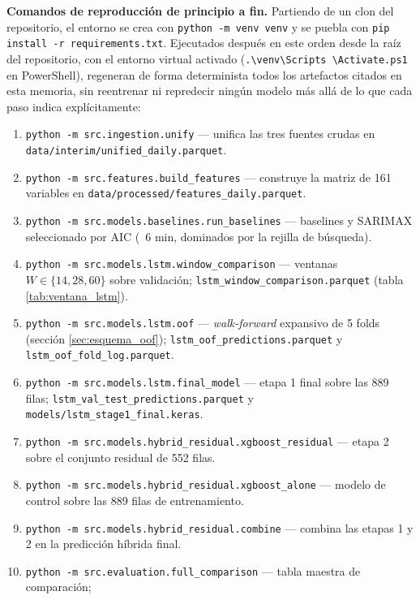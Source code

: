 \begin{sloppypar}
\textbf{Comandos de reproducción de principio a fin.} Partiendo de un clon del
repositorio, el entorno se crea con \texttt{python -m venv venv} y se puebla con
\texttt{pip install -r requirements.txt}. Ejecutados después en este orden desde la raíz
del repositorio, con el entorno virtual activado
(\texttt{.\allowbreak{}\textbackslash{}venv\allowbreak{}\textbackslash{}Scripts%
\allowbreak{}\textbackslash{}Activate.ps1} en PowerShell), regeneran de forma determinista
todos los artefactos citados en esta memoria, sin reentrenar ni repredecir ningún modelo
más allá de lo que cada paso indica explícitamente:

{\small
\begin{enumerate}[nosep]
  \item \texttt{python -m src.ingestion.unify} — unifica las tres fuentes crudas en
    \texttt{data/\allowbreak{}interim/\allowbreak{}unified\_daily.parquet}.
  \item \texttt{python -m src.features.build\_features} — construye la matriz de 161
    variables en \texttt{data/\allowbreak{}processed/\allowbreak{}features\_daily.parquet}.
  \item \texttt{python -m src.models.baselines.run\_baselines} — baselines y SARIMAX
    seleccionado por AIC (~6 min, dominados por la rejilla de búsqueda).
  \item \texttt{python -m src.models.lstm.window\_comparison} — ventanas
    $W \in \{14, 28, 60\}$ sobre validación;
    \texttt{lstm\_window\_comparison.parquet} (tabla \ref{tab:ventana_lstm}).
  \item \texttt{python -m src.models.lstm.oof} — \emph{walk-forward} expansivo de 5 folds
    (sección \ref{sec:esquema_oof}); \texttt{lstm\_oof\_predictions.parquet} y
    \texttt{lstm\_oof\_fold\_log.parquet}.
  \item \texttt{python -m src.models.lstm.final\_model} — etapa 1 final sobre las 889
    filas; \texttt{lstm\_val\_test\_predictions.parquet} y
    \texttt{models/\allowbreak{}lstm\_stage1\_final.keras}.
  \item \texttt{python -m src.models.hybrid\_residual.xgboost\_residual} — etapa 2 sobre
    el conjunto residual de 552 filas.
  \item \texttt{python -m src.models.hybrid\_residual.xgboost\_alone} — modelo de control
    sobre las 889 filas de entrenamiento.
  \item \texttt{python -m src.models.hybrid\_residual.combine} — combina las etapas 1 y 2
    en la predicción híbrida final.
  \item \texttt{python -m src.evaluation.full\_comparison} — tabla maestra de comparación;

\end{enumerate}}
\end{sloppypar}
